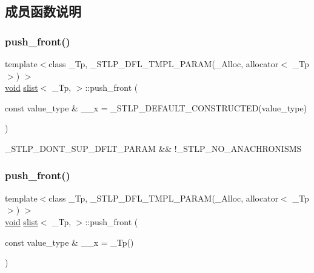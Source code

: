 \subsection{成员函数说明}
\mbox{\label{classslist_a78626cbca107457f6be0e5ef5def06bb}} 
\subsubsection{\texorpdfstring{push\+\_\+front()}{push\_front()}\hspace{0.1cm}{\footnotesize\ttfamily [1/2]}}
{\footnotesize\ttfamily template$<$class \+\_\+\+Tp, \+\_\+\+S\+T\+L\+P\+\_\+\+D\+F\+L\+\_\+\+T\+M\+P\+L\+\_\+\+P\+A\+R\+A\+M(\+\_\+\+Alloc, allocator$<$ \+\_\+\+Tp $>$) $>$ \\
\hyperlink{interfacevoid}{void} \hyperlink{classslist}{slist}$<$ \+\_\+\+Tp, $>$\+::push\+\_\+front (\begin{DoxyParamCaption}\item[{const value\+\_\+type \&}]{\+\_\+\+\_\+x = {\ttfamily \+\_\+STLP\+\_\+DEFAULT\+\_\+CONSTRUCTED(value\+\_\+type)} }\end{DoxyParamCaption})\hspace{0.3cm}{\ttfamily [inline]}}

\+\_\+\+S\+T\+L\+P\+\_\+\+D\+O\+N\+T\+\_\+\+S\+U\+P\+\_\+\+D\+F\+L\+T\+\_\+\+P\+A\+R\+AM \&\& !\+\_\+\+S\+T\+L\+P\+\_\+\+N\+O\+\_\+\+A\+N\+A\+C\+H\+R\+O\+N\+I\+S\+MS \mbox{\label{classslist_a820c857644421cf406746b4ea5982582}} 
\subsubsection{\texorpdfstring{push\+\_\+front()}{push\_front()}\hspace{0.1cm}{\footnotesize\ttfamily [2/2]}}
{\footnotesize\ttfamily template$<$class \+\_\+\+Tp, \+\_\+\+S\+T\+L\+P\+\_\+\+D\+F\+L\+\_\+\+T\+M\+P\+L\+\_\+\+P\+A\+R\+A\+M(\+\_\+\+Alloc, allocator$<$ \+\_\+\+Tp $>$) $>$ \\
\hyperlink{interfacevoid}{void} \hyperlink{classslist}{slist}$<$ \+\_\+\+Tp, $>$\+::push\+\_\+front (\begin{DoxyParamCaption}\item[{const value\+\_\+type \&}]{\+\_\+\+\_\+x = {\ttfamily \+\_\+Tp()} }\end{DoxyParamCaption})\hspace{0.3cm}{\ttfamily [inline]}}


